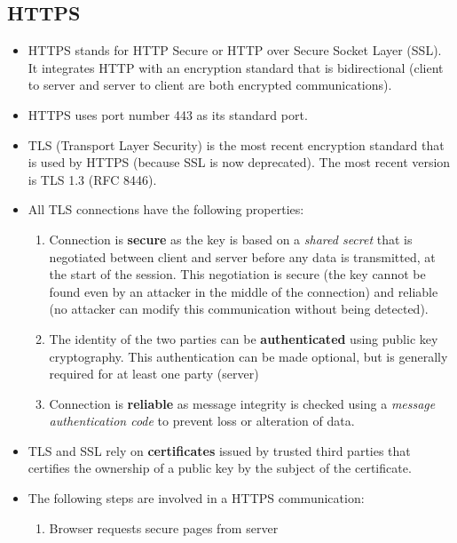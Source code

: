 \documentclass{article}
\theoremstyle{plain}
\theoremstyle{definition}
\begin{document}
\subsection{HTTPS}
\begin{itemize}
    \item HTTPS stands for HTTP Secure or HTTP over Secure Socket Layer (SSL). It integrates HTTP with an encryption standard that is bidirectional (client to server and server to client are both encrypted communications).
    
    \item HTTPS uses port number 443 as its standard port. 
    
    \item TLS (Transport Layer Security) is the most recent encryption standard that is used by HTTPS (because SSL is now deprecated). The most recent version is TLS 1.3 (RFC 8446).
    
    \item All TLS connections have the following properties:
    \begin{enumerate}
        \item Connection is \textbf{secure} as the key is based on a \textit{shared secret} that is negotiated between client and server before any data is transmitted, at the start of the session. This negotiation is secure (the key cannot be found even by an attacker in the middle of the connection) and reliable (no attacker can modify this communication without being detected). 
        
        \item The identity of the two parties can be \textbf{authenticated} using public key cryptography. This authentication can be made optional, but is generally required for at least one party (server)
        
        \item Connection is \textbf{reliable} as message integrity is checked using a \textit{message authentication code} to prevent loss or alteration of data. 
    \end{enumerate}
    
    \item TLS and SSL rely on \textbf{certificates} issued by trusted third parties that certifies the ownership of a public key by the subject of the certificate. 
    
    \item The following steps are involved in a HTTPS communication:
    \begin{enumerate}
        \item Browser requests secure pages from server
        

\end{enumerate}
\end{itemize}
\end{document}
